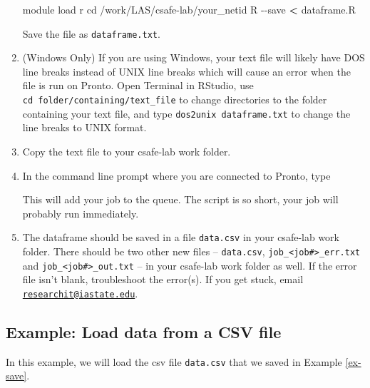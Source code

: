 \documentclass[
]{book}
\newenvironment{Shaded}{\begin{snugshade}}{\end{snugshade}}
\newcommand{\AttributeTok}[1]{\textcolor[rgb]{0.77,0.63,0.00}{#1}}
\newcommand{\BuiltInTok}[1]{#1}
\newcommand{\ExtensionTok}[1]{#1}
\newcommand{\NormalTok}[1]{#1}
\newcommand{\OperatorTok}[1]{\textcolor[rgb]{0.81,0.36,0.00}{\textbf{#1}}}
\begin{document}
\begin{enumerate}
\begin{Shaded}
\begin{Highlighting}[]
\ExtensionTok{module}\NormalTok{ load r}
\BuiltInTok{cd}\NormalTok{ /work/LAS/csafe{-}lab/your\_netid}
\ExtensionTok{R} \AttributeTok{{-}{-}save} \OperatorTok{\textless{}}\NormalTok{ dataframe.R}
\end{Highlighting}
\end{Shaded}

  Save the file as \texttt{dataframe.txt}.
\item
  (Windows Only) If you are using Windows, your text file will likely have DOS line breaks instead of UNIX line breaks which will cause an error when the file is run on Pronto. Open Terminal in RStudio, use \texttt{cd\ folder/containing/text\_file} to change directories to the folder containing your text file, and type \texttt{dos2unix\ dataframe.txt} to change the line breaks to UNIX format.
\item
  Copy the text file to your csafe-lab work folder.
\item
  In the command line prompt where you are connected to Pronto, type

\begin{Shaded}
\end{Shaded}

  This will add your job to the queue. The script is so short, your job will probably run immediately.
\item
  The dataframe should be saved in a file \texttt{data.csv} in your csafe-lab work folder. There should be two other new files -- \texttt{data.csv}, \texttt{job\_\textless{}job\#\textgreater{}\_err.txt} and \texttt{job\_\textless{}job\#\textgreater{}\_out.txt} -- in your csafe-lab work folder as well. If the error file isn't blank, troubleshoot the error(s). If you get stuck, email \href{mailto:researchit@iastate.edu}{\nolinkurl{researchit@iastate.edu}}.
\end{enumerate}

\hypertarget{ex-load}{%
\subsection{Example: Load data from a CSV file}\label{ex-load}}

In this example, we will load the csv file \texttt{data.csv} that we saved in Example \ref{ex-save}.
\end{document}
